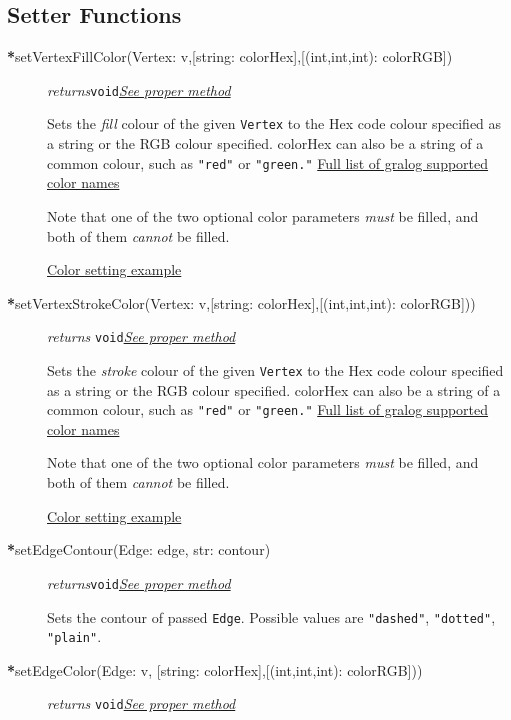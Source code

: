 \subsection{Setter Functions}
\begin{description}
\item[\textbf{*}setVertexFillColor(Vertex: v,{[string: colorHex]},{[(int,int,int): colorRGB]})]\emph{returns}\texttt{void}\quad \hyperref[setVertexFillColorClass]{\textit{See proper method}}

Sets the \textit{fill} colour of the given \texttt{Vertex} to the Hex code colour
specified as a string or the RGB colour specified. colorHex can also be
a string of a common colour, such as \texttt{"red"} or
\texttt{"green."} \hyperref[colorNamesSupportedByGralog]{Full list of gralog supported color names}

Note that one of the two optional color parameters \textit{must} be filled, and both of them \textit{cannot} be filled.

\hyperref[colorNamesSupportedByGralog]{Color setting example}

\item[\textbf{*}setVertexStrokeColor(Vertex: v,{[string: colorHex]},{[(int,int,int): colorRGB]}))] \emph{returns} \texttt{void}\quad \hyperref[setVertexStrokeColorClass]{\textit{See proper method}}

Sets the \textit{stroke} colour of the given \texttt{Vertex} to the Hex code colour
specified as a string or the RGB colour specified. colorHex can also be
a string of a common colour, such as \texttt{"red"} or
\texttt{"green."} \hyperref[colorNamesSupportedByGralog]{Full list of gralog supported color names}

Note that one of the two optional color parameters \textit{must} be filled, and both of them \textit{cannot} be filled.

\hyperref[colorNamesSupportedByGralog]{Color setting example}

\item[\textbf{*}setEdgeContour(Edge: edge, str: contour)] \emph{returns}\texttt{void}\quad \hyperref[setEdgeContourClass]{\textit{See proper method}}

Sets the contour of passed \texttt{Edge}. Possible values are
\texttt{"dashed"}, \texttt{"dotted"}, \texttt{"plain"}.

\item[\textbf{*}setEdgeColor(Edge: v, {[string: colorHex]},{[(int,int,int): colorRGB]}))] \emph{returns} \texttt{void}\quad \hyperref[setEdgeColorClass]{\textit{See proper method}}


\end{description}
